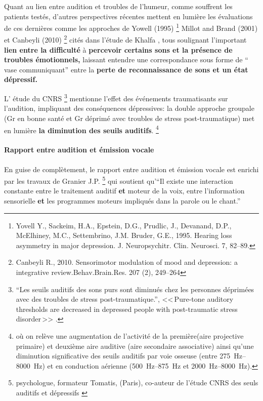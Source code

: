    

 
Quant au lien entre audition et troubles de l'humeur, comme souffrent
les patients testés, d'autres perspectives
récentes mettent en lumière les évaluations de ces dernières comme les
approches de Yowell (1995) \footnote{Yovell
  Y., Sackeim, H.A., Epstein, D.G., Prudlic, J., Devanand, D.P.,
  McElhiney, M.C., Settembrino, J.M. Bruder, G.E., 1995. Hearing loss
  asymmetry in major depression. J. Neuropsychitr. Clin. Neurosci. 7,
  82--89.} Millot and Brand (2001) et 
Canbeyli (2010) \footnote{Canbeyli R., 2010. Sensorimotor modulation of mood and
depression: a integrative review.Behav.Brain.Res. 207 (2), 249--264}
cités dans l'étude de Khalfa \autocite{affectiveDisorders}, tous soulignant l'important\textbf{ lien entre la difficulté}
à \textbf{percevoir certains sons et la présence de troubles émotionnels,}
laissant entendre une correspondance sous forme de `` vase communiquant''
entre la \textbf{perte de reconnaissance de
sons et un état dépressif.}

L' étude du CNRS \autocite{affectiveDisorders}\footnote{``Les seuils auditifs des sons purs 
	sont diminués chez les personnes déprimées avec des
	troubles de stress post-traumatique.'', <<\,Pure-tone auditory 
	thresholds are decreased in depressed people with post-traumatic stress 
disorder\,>>
	.} mentionne l'effet des événements
traumatisants sur l'audition, impliquant des conséquences dépressives:
la double approche groupale (Gr en bonne santé et Gr déprimé avec
troubles de stress post-traumatique) met en lumière \textbf{la diminution des
  seuils auditifs}. %
\footnote{où on relève une augmentation de l'activité de la
première(aire projective primaire)  et deuxième aire auditive (aire
secondaire associative) ainsi qu'une diminution significative des
seuils auditifs par voie osseuse (entre
\SIrange{275}{8000}{\Hz}) et en conduction aérienne
(\SIrange{500}{875}{\Hz} et  \SIrange{2000}{8000}{\Hz}).}

\paragraph{Rapport entre audition et émission vocale}

En guise de complètement, le rapport entre audition et émission vocale
est enrichi par les travaux de Granier J.P. \footnote{psychologue, formateur
Tomatis, (Paris), co-auteur de l'étude CNRS des seuls auditifs et
dépressifs \autocite{affectiveDisorders} }
qui soutient qu'``Il existe une 
interaction
constante entre le traitement auditif \textbf{et} moteur de la
voix, entre l'information sensorielle \textbf{et} les programmes moteurs impliqués
dans la parole ou le chant.''


